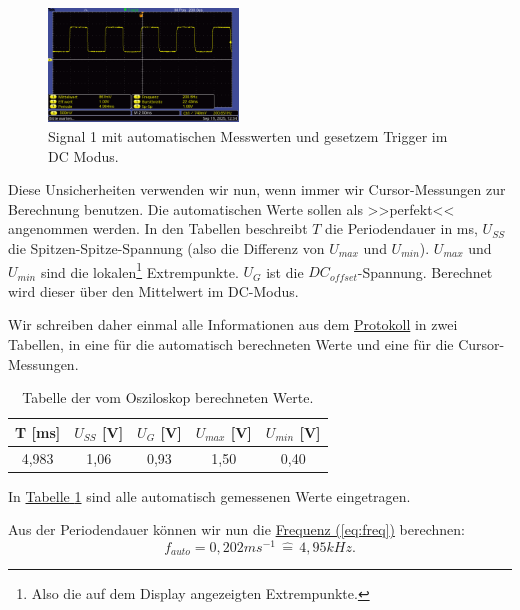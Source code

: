 \begin{figure} [h!]
    \centering
        \includegraphics[width=0.45\textwidth]{img/25/Signale2/Signal1-DC.pdf}
    \caption{Signal 1 mit automatischen Messwerten und gesetzem Trigger im DC Modus.}
\end{figure}

Diese Unsicherheiten verwenden wir nun, wenn immer wir Cursor-Messungen zur Berechnung benutzen. Die automatischen Werte sollen als >>perfekt<< angenommen werden.
In den Tabellen beschreibt $T$ die Periodendauer in ms, $U_{SS}$ die Spitzen-Spitze-Spannung (also die Differenz von $U_{max}$ und $U_{min}$). $U_{max}$ und $U_{min}$ sind die lokalen\footnote{Also die auf dem Display angezeigten Extrempunkte.} Extrempunkte. $U_{G}$ ist die $DC_{offset}$-Spannung. Berechnet wird dieser über den Mittelwert im DC-Modus.

Wir schreiben daher einmal alle Informationen aus dem  \hyperref[Protokoll]{Protokoll} in zwei Tabellen, in eine für die automatisch berechneten Werte und eine für die Cursor-Messungen.

\begin{table}[h!]
    \centering
    \begin{tabular}{c | c | c | c | c }
        \toprule
        T [ms] & $U_{SS}$ [V] & $U_{G}$ [V] & $U_{max}$ [V] & $U_{min}$ [V] \\
        \hline
        4,983 & 1,06 & 0,93 & 1,50 & 0,40 \\
        \bottomrule
    \end{tabular}
    \caption{Tabelle der vom Osziloskop berechneten Werte.}
    \label{tab:sig1_auto}
\end{table}

In \hyperref[tab:sig1_auto]{Tabelle \ref*{tab:sig1_auto}} sind alle automatisch gemessenen Werte eingetragen. 

Aus der Periodendauer können wir nun die \hyperref[eq:freq]{Frequenz (\ref*{eq:freq})} berechnen:
\begin{equation}
    \boxed{
        f_{auto} = 0,202 ms^{-1} \, \hat = \, 4,95 kHz
    }.
\end{equation}

